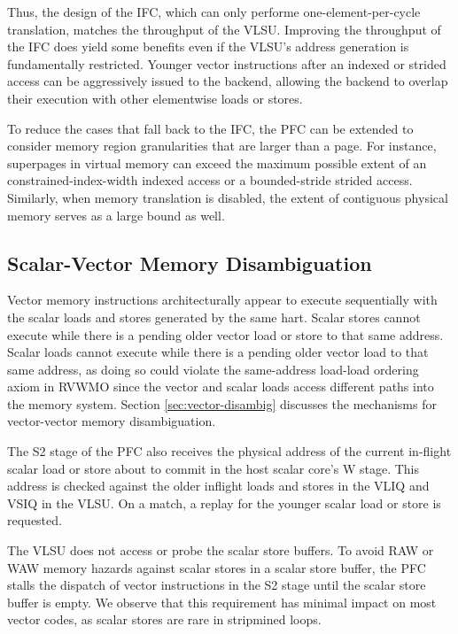 Thus, the design of the IFC, which can only performe one-element-per-cycle translation, matches the throughput of the VLSU.
Improving the throughput of the IFC does yield some benefits even if the VLSU's address generation is fundamentally restricted.
Younger vector instructions after an indexed or strided access can be aggressively issued to the backend, allowing the backend to overlap their execution with other elementwise loads or stores.

To reduce the cases that fall back to the IFC, the PFC can be extended to consider memory region granularities that are larger than a page.
For instance, superpages in virtual memory can exceed the maximum possible extent of an constrained-index-width indexed access or a bounded-stride strided access.
Similarly, when memory translation is disabled, the extent of contiguous physical memory serves as a large bound as well.


\subsection{Scalar-Vector Memory Disambiguation}
\label{sec:scalar-disambig}

Vector memory instructions architecturally appear to execute sequentially with the scalar loads and stores generated by the same hart.
Scalar stores cannot execute while there is a pending older vector load or store to that same address.
Scalar loads cannot execute while there is a pending older vector load to that same address, as doing so could violate the same-address load-load ordering axiom in RVWMO since the vector and scalar loads access different paths into the memory system.
Section \ref{sec:vector-disambig} discusses the mechanisms for vector-vector memory disambiguation.

The S2 stage of the PFC also receives the physical address of the current in-flight scalar load or store about to commit in the host scalar core's W stage.
This address is checked against the older inflight loads and stores in the VLIQ and VSIQ in the VLSU.
On a match, a replay for the younger scalar load or store is requested.

The VLSU does not access or probe the scalar store buffers.
To avoid RAW or WAW memory hazards against scalar stores in a scalar store buffer, the PFC stalls the dispatch of vector instructions in the S2 stage until the scalar store buffer is empty.
We observe that this requirement has minimal impact on most vector codes, as scalar stores are rare in stripmined loops.

